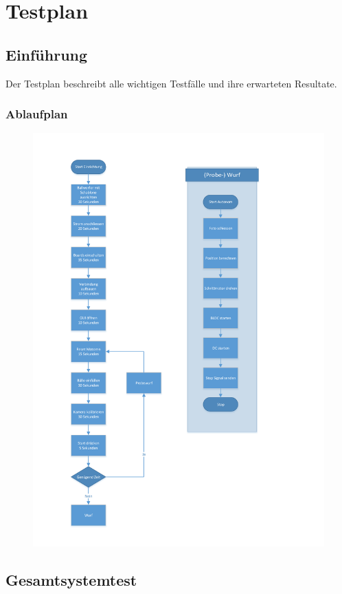 \section{Testplan}

\subsection{Einführung}

Der Testplan beschreibt alle wichtigen Testfälle und ihre erwarteten Resultate.

\subsubsection{Ablaufplan}
\begin{figure}
	\centering
	\includegraphics[width=0.9\linewidth]{../../fig/ablauf-ballwurf}
	\caption{}
	\label{fig:ablauf-ballwurf}
\end{figure}

\subsection{Gesamtsystemtest}

